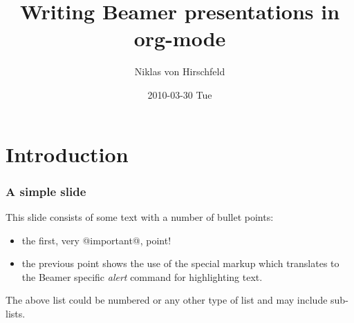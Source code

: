 \documentclass[bigger]{beamer}
\institute{{{{beamerinstitute}}}}
\author{Niklas von Hirschfeld}
\date{2010-03-30 Tue}
\title{Writing Beamer presentations in org-mode}
\begin{document}
\maketitle
\tableofcontents


\section{Introduction}
\label{sec:orga324e86}
\begin{frame}[fragile]\frametitle{A simple slide}
\label{sec:org6695a63}
This slide consists of some text with a number of bullet points:

\begin{itemize}
\item the first, very @important@, point!
\item the previous point shows the use of the special markup which
translates to the Beamer specific \emph{alert} command for highlighting
text.
\end{itemize}


The above list could be numbered or any other type of list and may
include sub-lists.
\end{frame}
\end{document}
